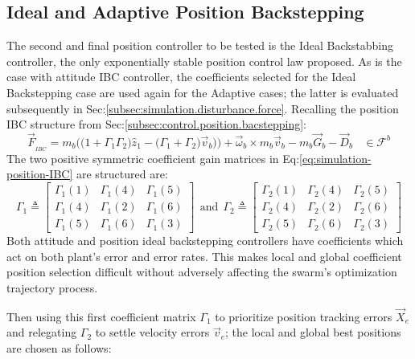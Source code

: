 \subsection{Ideal and Adaptive Position Backstepping}
\label{subsec:simulation.position.pd}
The second and final position controller to be tested is the Ideal Backstabbing controller, the only exponentially stable position control law proposed. As is the case with attitude IBC controller, the coefficients selected for the Ideal Backstepping case are used again for the Adaptive cases; the latter is evaluated subsequently in Sec:\ref{subsec:simulation.disturbance.force}. Recalling the position IBC structure from Sec:\ref{subsec:control.position.bacstepping}:
\begin{equation}\label{eq:simulation-position-IBC}
\vec{F}_{_{IBC}}=m_b\Big(\big(1+\Gamma_1\Gamma_2\big)\hat{z}_1-\big(\Gamma_1+\Gamma_2\big)\vec{v}_b\big)\Big)+\vec{\omega}_b\times m_b\vec{v}_b-m_b\vec{G}_b-\vec{D}_b~~~~\in\mathcal{F}^{b}
\end{equation}
The two positive symmetric coefficient gain matrices in Eq:\ref{eq:simulation-position-IBC} are structured are:
\begin{equation}\label{eq:simulation-position-diagonal-coefficients}
\Gamma_1\triangleq \begin{bmatrix}
\Gamma_1(1) & \Gamma_1(4) & \Gamma_1(5)\\
\Gamma_1(4) & \Gamma_1(2) & \Gamma_1(6)\\
\Gamma_1(5) & \Gamma_1(6) & \Gamma_1(3)
\end{bmatrix}
~~\text{and}~~\Gamma_2\triangleq \begin{bmatrix}
\Gamma_2(1) & \Gamma_2(4) & \Gamma_2(5)\\
\Gamma_2(4) & \Gamma_2(2) & \Gamma_2(6)\\
\Gamma_2(5) & \Gamma_2(6) & \Gamma_2(3)
\end{bmatrix}
\end{equation}
Both attitude and position ideal backstepping controllers have coefficients which act on both plant's error and error rates. This makes local and global coefficient position selection difficult without adversely affecting the swarm's optimization trajectory process. 
\par
Then using this first coefficient matrix $\Gamma_1$ to prioritize position tracking errors $\vec{X}_e$ and relegating $\Gamma_2$ to settle velocity errors $\vec{v}_e$; the local and global best positions are chosen as follows:
